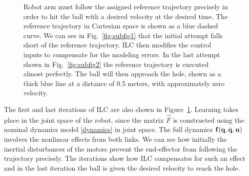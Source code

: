 \begin{figure}[ht]
\centering
{}
\caption{Robot arm must follow the assigned reference trajectory precisely in order to hit the ball with a desired velocity at the desired time. The reference trajectory in Cartesian space is shown as a blue dashed curve. We can see in Fig.~\ref{fig:subfig1} that the initial attempt falls short of the reference trajectory. ILC then modifies the control inputs to compensate for the modeling errors. In the last attempt shown in Fig.~\ref{fig:subfig2} the reference trajectory is executed almost perfectly. The ball will then approach the hole, shown as a thick blue line at a distance of 0.5 meters, with approximately zero velocity.} 
\label{putting1} 
\end{figure}

The first and last iterations of ILC are also shown in Figure~\ref{putting1}. Learning takes place in the joint space of the robot, since the matrix $\vec{F}$ is constructed using the nominal dynamics model \eqref{dynamics} in joint space. The full dynamics $\boldsymbol{\mathrm{f}}(\boldsymbol{\mathrm{q}},\dot{\boldsymbol{\mathrm{q}}},\boldsymbol{\mathrm{u}})$ involves the nonlinear effects from both links. We can see how initially the inertial disturbances of the motors prevent the end-effector from following the trajectory precisely. The iterations show how ILC compensates for such an effect and in the last iteration the ball is given the desired velocity to reach the hole. 

